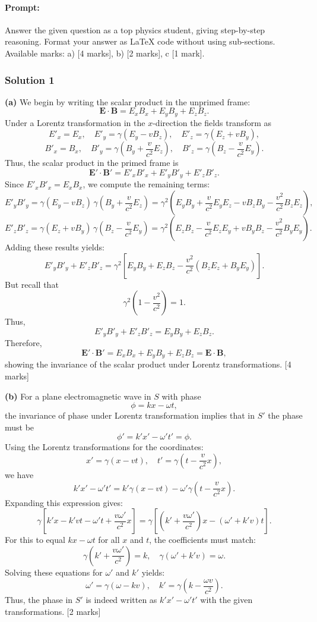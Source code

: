 \documentclass{article}
\begin{document}
\paragraph{Prompt: \\} 
Answer the given question as a top physics student, giving step-by-step reasoning. Format your answer as LaTeX code without using sub-sections. Available marks: a) [4 marks], b) [2 marks], c [1 mark].

\subsubsection{Solution 1}
\textbf{(a)} We begin by writing the scalar product in the unprimed frame:
\[
\mathbf{E} \cdot \mathbf{B} = E_x B_x + E_y B_y + E_z B_z.
\]
Under a Lorentz transformation in the \(x\)-direction the fields transform as
\[
E'_x = E_x,\quad E'_y = \gamma (E_y - vB_z),\quad E'_z = \gamma (E_z + vB_y),
\]
\[
B'_x = B_x,\quad B'_y = \gamma \left( B_y + \frac{v}{c^2} E_z \right),\quad B'_z = \gamma \left( B_z - \frac{v}{c^2} E_y \right).
\]
Thus, the scalar product in the primed frame is
\[
\mathbf{E}' \cdot \mathbf{B}' = E'_x B'_x + E'_y B'_y + E'_z B'_z.
\]
Since \(E'_x B'_x = E_x B_x\), we compute the remaining terms:
\[
E'_y B'_y = \gamma (E_y - vB_z)\, \gamma \left(B_y + \frac{v}{c^2}E_z\right) = \gamma^2\left( E_yB_y + \frac{v}{c^2}E_yE_z - vB_zB_y - \frac{v^2}{c^2}B_zE_z\right),
\]
\[
E'_z B'_z = \gamma (E_z + vB_y)\, \gamma \left(B_z - \frac{v}{c^2}E_y\right) = \gamma^2\left( E_zB_z - \frac{v}{c^2}E_zE_y + vB_yB_z - \frac{v^2}{c^2}B_yE_y\right).
\]
Adding these results yields:
\[
E'_y B'_y + E'_z B'_z = \gamma^2 \left[ E_yB_y + E_zB_z - \frac{v^2}{c^2}(B_zE_z+B_yE_y) \right].
\]
But recall that
\[
\gamma^2\left(1-\frac{v^2}{c^2}\right)=1.
\]
Thus,
\[
E'_y B'_y + E'_z B'_z = E_yB_y + E_zB_z.
\]
Therefore,
\[
\mathbf{E}' \cdot \mathbf{B}' = E_xB_x + E_yB_y + E_zB_z = \mathbf{E} \cdot \mathbf{B},
\]
showing the invariance of the scalar product under Lorentz transformations. \hfill [4 marks]

\bigskip

\textbf{(b)} For a plane electromagnetic wave in \(S\) with phase
\[
\phi = kx - \omega t,
\]
the invariance of phase under Lorentz transformation implies that in \(S'\) the phase must be
\[
\phi' = k'x' - \omega' t' = \phi.
\]
Using the Lorentz transformations for the coordinates:
\[
x' = \gamma (x - vt),\quad t' = \gamma \left(t - \frac{v}{c^2}x\right),
\]
we have
\[
k'x' - \omega' t' = k'\gamma (x-vt) - \omega'\gamma \left(t-\frac{v}{c^2}x\right).
\]
Expanding this expression gives:
\[
\gamma \left[ k'x - k'vt - \omega't + \frac{v\omega'}{c^2}x \right] = \gamma \left[\left(k' + \frac{v\omega'}{c^2}\right)x - (\omega' + k'v)t \right].
\]
For this to equal \(kx - \omega t\) for all \(x\) and \(t\), the coefficients must match:
\[
\gamma \left(k' + \frac{v\omega'}{c^2}\right) = k,\quad \gamma (\omega' + k'v) = \omega.
\]
Solving these equations for \(\omega'\) and \(k'\) yields:
\[
\omega' = \gamma (\omega - k v),\quad k' = \gamma \left(k - \frac{\omega v}{c^2}\right).
\]
Thus, the phase in \(S'\) is indeed written as \(k' x' - \omega' t'\) with the given transformations. \hfill [2 marks]
\end{document}
